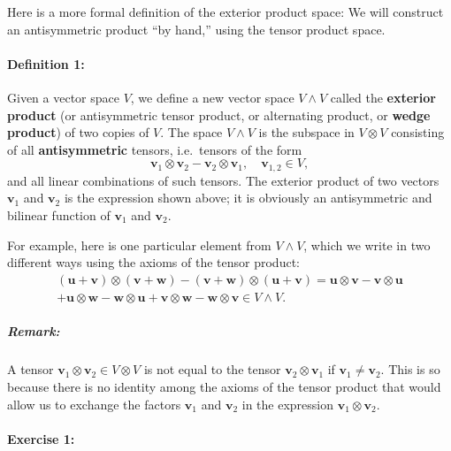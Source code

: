 Here is a more formal definition of the exterior product space: We
will construct an antisymmetric product {}``by hand,'' using the
tensor product space.


\paragraph{Definition 1:}

Given a vector space $V$, we define a new vector space $V\wedge V$
called the \textbf{exterior product} (or
antisymmetric tensor product, or alternating product, or \textbf{wedge
product}) of two copies of $V$. The space $V\wedge V$
is the subspace in $V\otimes V$ consisting of all \textbf{antisymmetric}
tensors, i.e.~tensors of the form\[
\mathbf{v}_{1}\otimes\mathbf{v}_{2}-\mathbf{v}_{2}\otimes\mathbf{v}_{1},\quad\mathbf{v}_{1,2}\in V,\]
and all linear combinations of such tensors. The exterior product
of two vectors $\mathbf{v}_{1}$ and $\mathbf{v}_{2}$ is the expression
shown above; it is obviously an antisymmetric and bilinear function
of $\mathbf{v}_{1}$ and $\mathbf{v}_{2}$.

For example, here is one particular element from $V\wedge V$, which
we write in two different ways using the axioms of the tensor product:\begin{align}
\left(\mathbf{u}+\mathbf{v}\right)\otimes\left(\mathbf{v}+\mathbf{w}\right)-\left(\mathbf{v}+\mathbf{w}\right)\otimes\left(\mathbf{u}+\mathbf{v}\right)=\mathbf{u}\otimes\mathbf{v}-\mathbf{v}\otimes\mathbf{u}\nonumber \\
+\mathbf{u}\otimes\mathbf{w}-\mathbf{w}\otimes\mathbf{u}+\mathbf{v}\otimes\mathbf{w}-\mathbf{w}\otimes\mathbf{v}\in V\wedge V.\label{eq:uvw calc 1}\end{align}



\subparagraph{Remark:}

A tensor $\mathbf{v}_{1}\otimes\mathbf{v}_{2}\in V\otimes V$ is not
equal to the tensor $\mathbf{v}_{2}\otimes\mathbf{v}_{1}$ if $\mathbf{v}_{1}\neq\mathbf{v}_{2}$.
This is so because there is no identity among the axioms of the tensor
product that would allow us to exchange the factors $\mathbf{v}_{1}$
and $\mathbf{v}_{2}$ in the expression $\mathbf{v}_{1}\otimes\mathbf{v}_{2}$.


\paragraph{Exercise 1:}

